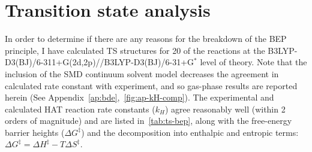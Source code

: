 \newpage
\section{Transition state analysis}

In order to determine if there are any reasons for the breakdown of the BEP principle, I have calculated TS structures for 20 of the reactions at the B3LYP-D3(BJ)/6-311+G(2d,2p)//B3LYP-D3(BJ)/6-31+G$^*$ level of theory. Note that the inclusion of the SMD continuum solvent model decreases the agreement in calculated rate constant with experiment, and so gas-phase results are reported herein (See Appendix~\ref{ap:bde},~\ref{fig:ap-kH-comp}). The experimental and calculated HAT reaction rate constants ($k_H$) agree reasonably well (within 2 orders of magnitude) and are listed in~\ref{tab:ts-bep}, along with the free-energy barrier heights ($\Delta G^\ddagger$) and the decomposition into enthalpic and entropic terms: $\Delta G^\ddagger = \Delta H^\ddagger - T\Delta S^\ddagger$.

